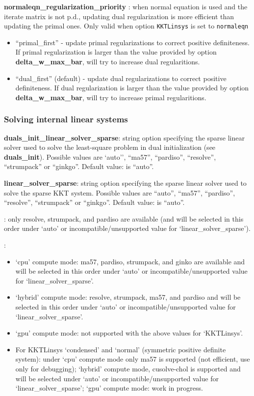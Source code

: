 \noindent \textbf{normaleqn\_regularization\_priority }: when normal equation is used and the iterate matrix is not p.d., updating dual regularization is more efficient than updating the primal ones. Only valid when option \texttt{KKTLinsys} is set to \texttt{normaleqn}
\begin{itemize}
\item ``primal\_first'' - update primal regularizations to correct positive definiteness. If primal regularization is larger than the value provided by option \textbf{delta\_w\_max\_bar}, \Hi will try to increase dual regularitions. 
\item ``dual\_first'' (default) - update dual regularizations to correct positive definiteness. If dual regularization is larger than the value provided by option \textbf{delta\_w\_max\_bar}, \Hi will try to increase primal regularitions. 
\end{itemize}
\medskip



\subsubsection{Solving internal linear systems}

\noindent \textbf{duals\_init\_linear\_solver\_sparse}: string option specifying the sparse linear solver used to solve the least-square problem in dual initialization (see \textbf{duals\_init}). Possible values are `auto'', ``ma57'', ``pardiso'', ``resolve'', ``strumpack'' or ``ginkgo''. Default value: is ``auto''.
\medskip

\noindent \textbf{linear\_solver\_sparse}: string option specifying the sparse linear solver used to solve the sparse KKT system. Possible values are ``auto'', ``ma57'', ``pardiso'', ``resolve'', ``strumpack'' or ``ginkgo''. Default value: is ``auto''.
\medskip

: only resolve, strumpack, and pardiso are available (and will be selected in this order under `auto' or incompatible/unsupported value for `linear\_solver\_sparse').

: 
\begin{itemize}
  \item `cpu' compute mode: ma57, pardiso, strumpack, and ginko are available and will be selected in this order under `auto' or incompatible/unsupported value for `linear\_solver\_sparse'.
  \item `hybrid' compute mode: resolve, strumpack, ma57, and pardiso and will be selected in this order under `auto' or incompatible/unsupported value for `linear\_solver\_sparse'.
  \item `gpu' compute mode: not supported with the above values for `KKTLinsys'.
  \item For KKTLinsys `condensed' and `normal' (symmetric positive definite system): under `cpu' compute mode only ma57 is supported (not efficient, use only for debugging); `hybrid' compute mode, cusolve-chol is supported and will be selected under `auto' or incompatible/unsupported value for `linear\_solver\_sparse'; `gpu' compute mode: work in progress.
\end{itemize}

